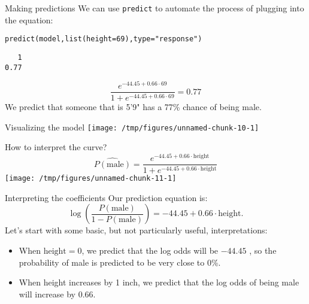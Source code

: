 \documentclass{beamer}\usepackage[]{graphicx}\usepackage[]{color}
\makeatletter
\def\maxwidth{ %
  \ifdim\Gin@nat@width>\linewidth
    \linewidth
  \else
    \Gin@nat@width
  \fi
}
\newcommand{\hlnum}[1]{\textcolor[rgb]{0.824,0.412,0.118}{#1}}%
\newcommand{\hlstr}[1]{\textcolor[rgb]{1,0.894,0.71}{#1}}%
\newcommand{\hlstd}[1]{\textcolor[rgb]{1,0.894,0.769}{#1}}%
\newcommand{\hlkwc}[1]{\textcolor[rgb]{0.78,0.941,0.545}{#1}}%
\newcommand{\hlkwd}[1]{\textcolor[rgb]{1,0.78,0.769}{#1}}%
\newenvironment{kframe}{%
 \def\at@end@of@kframe{}%
 \ifinner\ifhmode%
  \def\at@end@of@kframe{\end{minipage}}%
  \begin{minipage}{\columnwidth}%
 \fi\fi%
 \def\FrameCommand##1{\hskip\@totalleftmargin \hskip-\fboxsep
 \colorbox{shadecolor}{##1}\hskip-\fboxsep
     \hskip-\linewidth \hskip-\@totalleftmargin \hskip\columnwidth}%
 \MakeFramed {\advance\hsize-\width
   \@totalleftmargin\z@ \linewidth\hsize
   \@setminipage}}%
 {\par\unskip\endMakeFramed%
 \at@end@of@kframe}
\newenvironment{knitrout}{}{} %
\makeatother
\begin{document}
\begin{darkframes}
    \begin{frame}[fragile]{Making predictions}
      We can use \texttt{predict} to automate the process of plugging into the equation:
\begin{knitrout}
\color{fgcolor}\begin{kframe}
\begin{alltt}
\hlkwd{predict}\hlstd{(model,} \hlkwd{list}\hlstd{(}\hlkwc{height}\hlstd{=}\hlnum{69}\hlstd{),} \hlkwc{type}\hlstd{=}\hlstr{"response"}\hlstd{)}
\end{alltt}
\begin{verbatim}
   1 
0.77 
\end{verbatim}
\end{kframe}
\end{knitrout}
      
      \[
        \frac{e^{-44.45 + 0.66\cdot 69}}{1 + e^{-44.45 + 0.66\cdot 69}} = 0.77
      \]
      \pause
      We predict that someone that is 5'9" has a 77\% chance of being male.
    \end{frame}

    \begin{frame}[fragile]{Visualizing the model}
\begin{knitrout}
\color{fgcolor}
\texttt{[image: /tmp/figures/unnamed-chunk-10-1]} 

\end{knitrout}
    \end{frame}

    \begin{frame}[fragile]{How to interpret the curve?}
      \[
        \widehat{P(\text{male})} = \frac{e^{-44.45 + 0.66\cdot\text{height}}}{1 + e^{-44.45 + 0.66\cdot\text{height}}}
      \]
\begin{knitrout}
\color{fgcolor}
\texttt{[image: /tmp/figures/unnamed-chunk-11-1]} 

\end{knitrout}
    \end{frame}

    \begin{frame}{Interpreting the coefficients}
      Our prediction equation is:
      \[
        \log\left(\frac{P(\text{male})}{1-P(\text{male})}\right) = -44.45 + 0.66\cdot\text{height}.
      \]
      Let's start with some basic, but not particularly useful, interpretations:
      \begin{itemize}[<+->]
        \item When $\text{height}=0$, we predict that the log odds will be $-44.45$ \pause, so the probability of male is predicted to be very close to 0\%.
        \item When height increases by 1 inch, we predict that the log odds of being male will increase by $0.66$.
      \end{itemize}
    \end{frame}


\end{darkframes}
\end{document}
